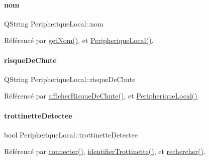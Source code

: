 \paragraph{\texorpdfstring{nom}{nom}}
{\footnotesize\ttfamily Q\+String Peripherique\+Local\+::nom}



Référencé par \hyperlink{class_peripherique_local_af105d458828fbb17e5b556e23d7d7b42}{get\+Nom()}, et \hyperlink{class_peripherique_local_a99a652b8659a3692f164cf1a0382e4bf}{Peripherique\+Local()}.

\mbox{\label{class_peripherique_local_a79a43778c2db1c9c70784b6329dc383e}} 
\paragraph{\texorpdfstring{risque\+De\+Chute}{risqueDeChute}}
{\footnotesize\ttfamily Q\+String Peripherique\+Local\+::risque\+De\+Chute}



Référencé par \hyperlink{class_peripherique_local_ac20ba20d69997e441b1b782f8b506291}{afficher\+Risque\+De\+Chute()}, et \hyperlink{class_peripherique_local_a99a652b8659a3692f164cf1a0382e4bf}{Peripherique\+Local()}.

\mbox{\label{class_peripherique_local_af6f664b6af67f1c90eb017391ac812ed}} 
\paragraph{\texorpdfstring{trottinette\+Detectee}{trottinetteDetectee}}
{\footnotesize\ttfamily bool Peripherique\+Local\+::trottinette\+Detectee}



Référencé par \hyperlink{class_peripherique_local_af2e7f023f8ed72ebc1d36e66c440ceca}{connecter()}, \hyperlink{class_peripherique_local_aab3b5a9b584b0191b9f690add1cfa6ed}{identifier\+Trottinette()}, et \hyperlink{class_peripherique_local_aa3b12b1c122605cf00b8ab48ed4284c1}{rechercher()}.

\mbox{\label{class_peripherique_local_aa0a0ebf6468e8a2c3a15828122ee830a}} 
